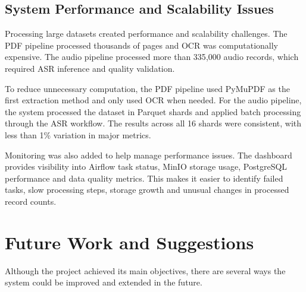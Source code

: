 \documentclass[12pt,oneside,openright,a4paper]{cpe-english-project}
\begin{document}
\subsection{System Performance and Scalability Issues}

Processing large datasets created performance and scalability challenges. The PDF pipeline processed thousands of pages and OCR was computationally expensive. The audio pipeline processed more than 335{,}000 audio records, which required ASR inference and quality validation.

To reduce unnecessary computation, the PDF pipeline used PyMuPDF as the first extraction method and only used OCR when needed. For the audio pipeline, the system processed the dataset in Parquet shards and applied batch processing through the ASR workflow. The results across all 16 shards were consistent, with less than 1\% variation in major metrics.

Monitoring was also added to help manage performance issues. The dashboard provides visibility into Airflow task status, MinIO storage usage, PostgreSQL performance and data quality metrics. This makes it easier to identify failed tasks, slow processing steps, storage growth and unusual changes in processed record counts.

\section{Future Work and Suggestions}

Although the project achieved its main objectives, there are several ways the system could be improved and extended in the future.
\end{document}
